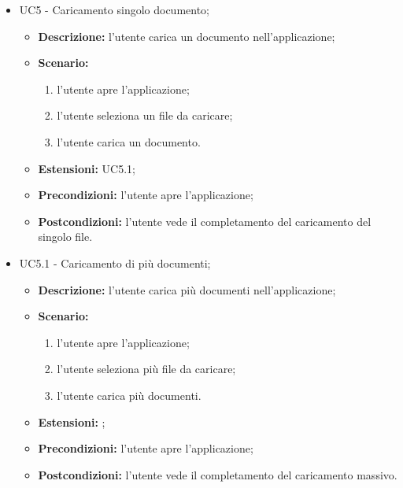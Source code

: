 \documentclass[10pt, a4paper]{article}
\begin{document}
\begin{itemize}
    \item UC5 - Caricamento singolo documento;
    \begin{itemize}
        \item \textbf{Descrizione: }l'utente carica un documento nell'applicazione;
        \item \textbf{Scenario: }
        \begin{enumerate}[label={\arabic*.}, align=left]
        \item l'utente apre l'applicazione;
        \item l'utente seleziona un file da caricare;
        \item l'utente carica un documento.
        \end{enumerate}
        \item \textbf{Estensioni: }UC5.1;
        \item \textbf{Precondizioni:} l'utente apre l'applicazione;
        \item \textbf{Postcondizioni:} l'utente vede il completamento del caricamento del singolo file.
    \end{itemize}
    \item UC5.1 - Caricamento di più documenti;
    \begin{itemize}
        \item \textbf{Descrizione: }l'utente carica più documenti nell'applicazione;
        \item \textbf{Scenario: }
        \begin{enumerate}[label={\arabic*.}, align=left]
        \item l'utente apre l'applicazione;
        \item l'utente seleziona più file da caricare;
        \item l'utente carica più documenti.
        \end{enumerate}
        \item \textbf{Estensioni: };
        \item \textbf{Precondizioni:} l'utente apre l'applicazione;
        \item \textbf{Postcondizioni:} l'utente vede il completamento del caricamento massivo.\\
    \end{itemize}
    

\end{itemize}
\end{document}
